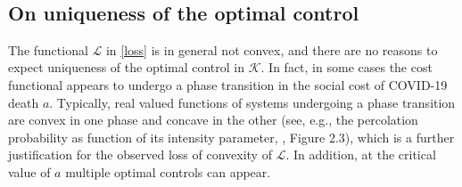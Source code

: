 \documentclass{amsart}
\begin{document}
\begin{eqnarray*}
\end{eqnarray*}
%


\subsection{On uniqueness of the optimal control} \label{uniqueness}
The functional $\mathcal{L}$ in  \eqref{loss} is in general not
convex, and there are  no reasons to expect uniqueness of the
optimal control in $\mathcal{K}$. In fact, in some cases
the cost functional appears to undergo a phase transition
 in the social cost of COVID-19 death $a$.
 Typically, real valued functions of systems undergoing a phase transition 
 are  convex in one phase and 
 concave in the other (see, e.g.,  the percolation probability as
 function of its intensity parameter, \cite{G}, Figure 2.3),
 which is a further justification for the observed loss
 of convexity of $\mathcal{L}$.
 In addition, at the critical value of $a$  multiple optimal 
 controls can appear. 
 
\end{document}
